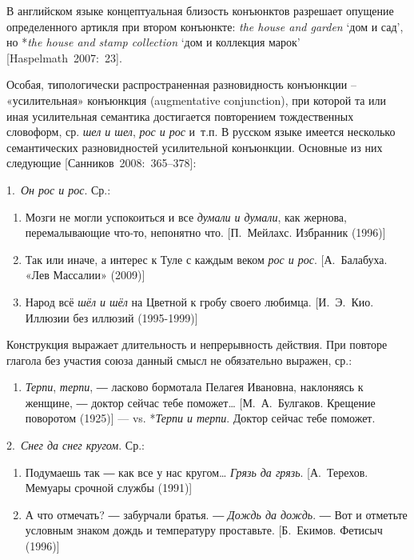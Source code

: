 В английском языке концептуальная близость конъюнктов разрешает опущение
определенного артикля при втором конъюнкте: \textit{the house and garden}
`дом и сад', но *\textit{the house and stamp collection} `дом и коллекция
марок' {[}Haspelmath~2007:~23{]}.

Особая, типологически распространенная разновидность конъюнкции --
«усилительная» конъюнкция (augmentative conjunction), при которой та или
иная усилительная семантика достигается повторением тождественных
словоформ, ср. \textit{шел и шел}, \textit{рос и рос} и~т.п. В русском языке
имеется несколько семантических разновидностей усилительной конъюнкции.
Основные из них следующие {[}Санников~2008:~365--378{]}:

1.~\textit{Он рос и рос}. Ср.:

\begin{enumerate}
  \def\labelenumi{(\arabic{enumi})}
  \setcounter{enumi}{160}
  \item
        Мозги не могли успокоиться и все \textit{думали и думали}, как жернова,
        перемалывающие что-то, непонятно что. {[}П.~Мейлахс. Избранник
        (1996){]}
  \item
        Так или иначе, а интерес к Туле с каждым веком \textit{рос и рос}.
        {[}А.~Балабуха. «Лев Массалии» (2009){]}
  \item
        Народ всё \textit{шёл и шёл} на Цветной к гробу своего любимца.
        {[}И.~Э.~Кио. Иллюзии без иллюзий (1995-1999){]}
\end{enumerate}

Конструкция выражает длительность и непрерывность действия. При повторе
глагола без участия союза данный смысл не обязательно выражен, ср.:

\begin{enumerate}
  \def\labelenumi{(\arabic{enumi})}
  \setcounter{enumi}{163}
  \item
        \textit{Терпи}, \textit{терпи}, ― ласково бормотала Пелагея Ивановна,
        наклоняясь к женщине, ― доктор сейчас тебе поможет\ldots{}
        {[}М.~А.~Булгаков. Крещение поворотом (1925){]} --- vs. *\textit{Терпи и
          терпи}. Доктор сейчас тебе поможет.
\end{enumerate}

2.~\textit{Снег да снег кругом}. Ср.:

\begin{enumerate}
  \def\labelenumi{(\arabic{enumi})}
  \setcounter{enumi}{164}
  \item
        Подумаешь так ― как все у нас кругом\ldots{} \textit{Грязь да грязь}.
        {[}А.~Терехов. Мемуары срочной службы (1991){]}
  \item
        А что отмечать? ― забурчали братья. ― \textit{Дождь да дождь}. ― Вот и
        отметьте условным знаком дождь и температуру проставьте. {[}Б.~Екимов.
        Фетисыч (1996){]}
\end{enumerate}

